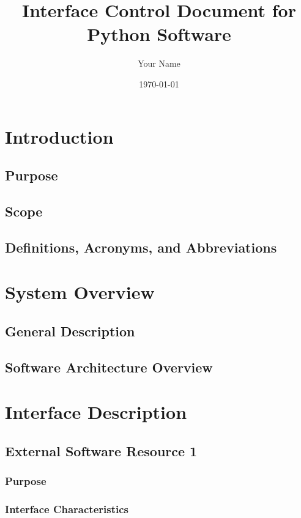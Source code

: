 \documentclass[11pt,a4paper]{article}
\begin{document}
\title{Interface Control Document for Python Software}
\author{Your Name}
\date{\today}

\maketitle
\newpage

\tableofcontents
\newpage

\section{Introduction}
\subsection{Purpose}
\subsection{Scope}
\subsection{Definitions, Acronyms, and Abbreviations}

\section{System Overview}
\subsection{General Description}
\subsection{Software Architecture Overview}

\section{Interface Description}
\subsection{External Software Resource 1}
\subsubsection{Purpose}
\subsubsection{Interface Characteristics}
\end{document}

